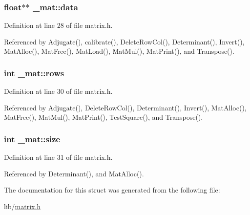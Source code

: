 \subsubsection[{\texorpdfstring{data}{data}}]{\setlength{\rightskip}{0pt plus 5cm}float$\ast$$\ast$ \+\_\+mat\+::data}\hypertarget{struct__mat_a00dcd82a8de11b7f16f7edfde55bcfae}{}\label{struct__mat_a00dcd82a8de11b7f16f7edfde55bcfae}


Definition at line 28 of file matrix.\+h.



Referenced by Adjugate(), calibrate(), Delete\+Row\+Col(), Determinant(), Invert(), Mat\+Alloc(), Mat\+Free(), Mat\+Load(), Mat\+Mul(), Mat\+Print(), and Transpose().

\subsubsection[{\texorpdfstring{rows}{rows}}]{\setlength{\rightskip}{0pt plus 5cm}int \+\_\+mat\+::rows}\hypertarget{struct__mat_a5e6bcb8b0c0239ca9b782c48b0b3c98a}{}\label{struct__mat_a5e6bcb8b0c0239ca9b782c48b0b3c98a}


Definition at line 30 of file matrix.\+h.



Referenced by Adjugate(), Delete\+Row\+Col(), Determinant(), Invert(), Mat\+Alloc(), Mat\+Free(), Mat\+Mul(), Mat\+Print(), Test\+Square(), and Transpose().

\subsubsection[{\texorpdfstring{size}{size}}]{\setlength{\rightskip}{0pt plus 5cm}int \+\_\+mat\+::size}\hypertarget{struct__mat_ab54203ad7b60fc23832cb3b2a863857f}{}\label{struct__mat_ab54203ad7b60fc23832cb3b2a863857f}


Definition at line 31 of file matrix.\+h.



Referenced by Determinant(), and Mat\+Alloc().



The documentation for this struct was generated from the following file\+:\begin{DoxyCompactItemize}
\item 
lib/\hyperlink{matrix_8h}{matrix.\+h}\end{DoxyCompactItemize}
